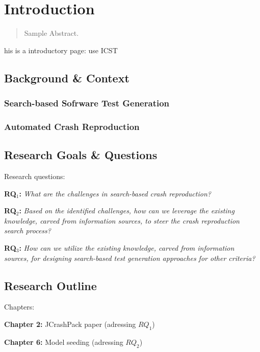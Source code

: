 \chapter{Introduction}
\label{introduction}

\begin{abstract}
Sample Abstract. 
\end{abstract}



\newpage

his is a introductory page: use ICST

\section{Background \& Context}
\subsection{Search-based Sofrware Test Generation}

\subsection{Automated Crash Reproduction}

\section{Research Goals \& Questions}
Research questions:


\textbf{RQ$_1$: } \textit{What are the challenges in search-based crash reproduction?}

\textbf{RQ$_2$: } \textit{Based on the identified challenges, how can we leverage the existing knowledge, carved from information sources, to steer the crash reproduction search process?}

\textbf{RQ$_3$: } \textit{How can we utilize the existing knowledge, carved from information sources, for designing search-based test generation approaches for other criteria?}


\section{Research Outline}

Chapters:

\textbf{Chapter 2: } JCrashPack paper (adressing $RQ_1$)


\textbf{Chapter 6: } Model seeding (adressing $RQ_2$)

